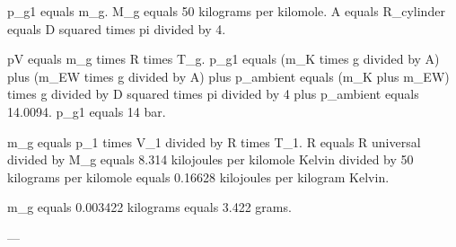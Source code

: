 p_g1 equals m_g.  
M_g equals 50 kilograms per kilomole.  
A equals R_cylinder equals D squared times pi divided by 4.  

pV equals m_g times R times T_g.  
p_g1 equals (m_K times g divided by A) plus (m_EW times g divided by A) plus p_ambient equals (m_K plus m_EW) times g divided by D squared times pi divided by 4 plus p_ambient equals 14.0094.  
p_g1 equals 14 bar.  

m_g equals p_1 times V_1 divided by R times T_1.  
R equals R universal divided by M_g equals 8.314 kilojoules per kilomole Kelvin divided by 50 kilograms per kilomole equals 0.16628 kilojoules per kilogram Kelvin.  

m_g equals 0.003422 kilograms equals 3.422 grams.  

---